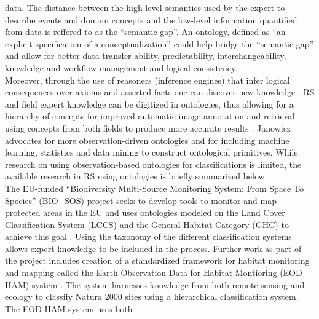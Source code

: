 \documentclass[authoryear, review,12pt,number]{elsarticle}
\begin{document}
data. The distance between the high-level semantics used by the expert to 
describe events and domain concepts and the low-level information quantified 
from data is reffered to as the ``semantic gap''. An ontology, defined as ``an 
explicit specification of a conceptualization'' \citep{gruber1993} could help 
bridge the ``semantic gap'' and allow for better data transfer-ability, 
predictability, interchangeability, knowledge and workflow management and 
logical consistency. 
\\
Moreover, through the use of reasoners (inference engines) 
that infer logical consequences over axioms and asserted facts one can discover 
new knowledge \citep{Arvor2013, Andres2013a}. RS and field expert knowledge can 
be digitized in ontologies, thus allowing for a hierarchy of concepts for 
improved automatic image annotation and retrieval using concepts from both 
fields to produce more accurate results 
\cite{Srikanth:2005:EOA:1076034.1076128}. Janowicz \cite{Janowicz2012} advocates 
for more observation-driven ontologies and for including machine learning, 
statistics and data mining to construct ontological primitives. While research 
on using observation-based ontologies for classifications is limited, the 
available research in RS using ontologies is briefly summarized below. \\
The EU-funded ``Biodiversity Multi-Source Monitoring System: From Space To
Species'' (BIO\_SOS) project seeks to develop tools to monitor and map protected
areas in the EU and uses ontologies modeled on the Land Cover Classification
System (LCCS) and the General Habitat Category (GHC) to achieve this goal
\citep{Arvor2013}. Using the taxonomy of the different classification systems
allows expert knowledge to be included in the process. Further work as part of
the project includes creation of a standardized
framework for habitat monitoring and mapping called the Earth Observation Data
for Habitat Montioring (EOD-HAM) system \citep{Lucas2015}. The system harnesses
knowledge from both remote sensing and ecology to classify Natura 2000 sites
using a hierarchical classification system. The EOD-HAM system uses both
\end{document}
